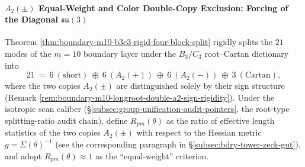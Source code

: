 \paragraph{\texorpdfstring{$A_2(\pm)$}{A2(±)} Equal-Weight and Color Double-Copy Exclusion: Forcing of the Diagonal \texorpdfstring{$\mathfrak{su}(3)$}{su(3)}}\label{par:bdry-a2pm-isotropy-diagonal-su3}
Theorem \ref{thm:boundary-m10-b3c3-rigid-four-block-split} rigidly splits the \(21\) modes of the \(m=10\) boundary layer under the \(B_3/C_3\) root--Cartan dictionary into
\[
21\ =\ 6\ (\mathrm{short})\ \oplus\ 6\ (A_2(+))\ \oplus\ 6\ (A_2(-))\ \oplus\ 3\ (\mathrm{Cartan}),
\]
where the two copies \(A_2(\pm)\) are distinguished solely by their sign structure (Remark \ref{rem:boundary-m10-longroot-double-a2-sign-rigidity}).
Under the isotropic scan caliber (\S\ref{subsec:group-unification-audit-pointers}, the root-type splitting-ratio audit chain), define \(R_{pm}(\theta)\) as the ratio of effective length statistics of the two copies \(A_2(\pm)\) with respect to the Hessian metric \(g=\Sigma(\theta)^{-1}\) (see the corresponding paragraph in \S\ref{subsec:bdry-tower-zeck-gut}), and adopt \(R_{pm}(\theta)\approx 1\) as the ``equal-weight'' criterion.

